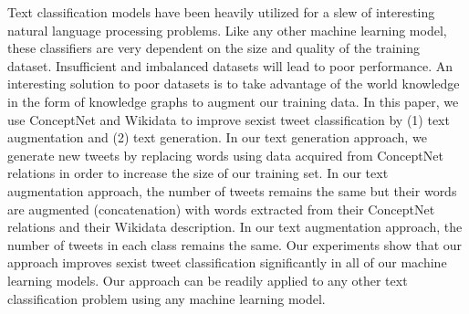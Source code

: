 Text classification models have been heavily utilized for a slew of interesting natural language processing problems. Like any other machine learning model, these classifiers are very dependent on the size and quality of the training dataset. Insufficient and imbalanced datasets will lead to poor performance. An interesting solution to poor datasets is to take advantage of the world knowledge in the form of knowledge graphs to augment our training data. In this paper, we use ConceptNet and Wikidata to improve sexist tweet classification by (1) text augmentation and (2) text generation. In our text generation approach, we generate new tweets by replacing words using data acquired from ConceptNet relations in order to increase the size of our training set. In our text augmentation approach, the number of tweets remains the same but their words are augmented (concatenation) with words extracted from their ConceptNet relations and their Wikidata description. In our text augmentation approach, the number of tweets in each class remains the same. Our experiments show that our approach improves sexist tweet classification significantly in all of our machine learning models. Our approach can be readily applied to any other text classification problem using any machine learning model.
